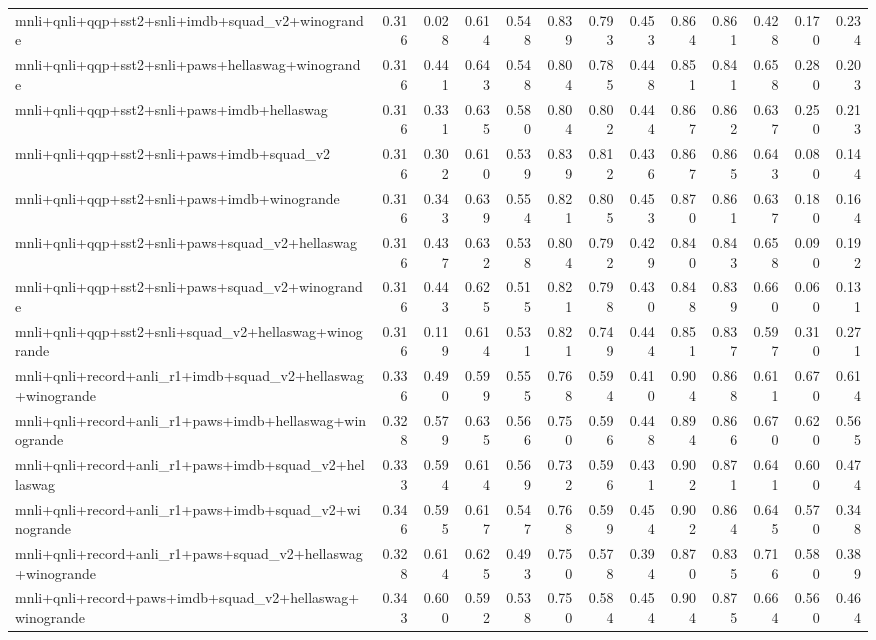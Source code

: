 \begin{table}[t]
\begin{tabular}{lrrrrrrrrrrrr}
    mnli+qnli+qqp+sst2+snli+imdb+squad\_v2+winogrande & 0.316 & 0.028 & 0.614 & 0.548 & 0.839 & 0.793 & 0.453 & 0.864 & 0.861 & 0.428 & 0.170 & 0.234 \\
    mnli+qnli+qqp+sst2+snli+paws+hellaswag+winogrande & 0.316 & 0.441 & 0.643 & 0.548 & 0.804 & 0.785 & 0.448 & 0.851 & 0.841 & 0.658 & 0.280 & 0.203 \\
    mnli+qnli+qqp+sst2+snli+paws+imdb+hellaswag & 0.316 & 0.331 & 0.635 & 0.580 & 0.804 & 0.802 & 0.444 & 0.867 & 0.862 & 0.637 & 0.250 & 0.213 \\
    mnli+qnli+qqp+sst2+snli+paws+imdb+squad\_v2 & 0.316 & 0.302 & 0.610 & 0.539 & 0.839 & 0.812 & 0.436 & 0.867 & 0.865 & 0.643 & 0.080 & 0.144 \\
    mnli+qnli+qqp+sst2+snli+paws+imdb+winogrande & 0.316 & 0.343 & 0.639 & 0.554 & 0.821 & 0.805 & 0.453 & 0.870 & 0.861 & 0.637 & 0.180 & 0.164 \\
    mnli+qnli+qqp+sst2+snli+paws+squad\_v2+hellaswag & 0.316 & 0.437 & 0.632 & 0.538 & 0.804 & 0.792 & 0.429 & 0.840 & 0.843 & 0.658 & 0.090 & 0.192 \\
    mnli+qnli+qqp+sst2+snli+paws+squad\_v2+winogrande & 0.316 & 0.443 & 0.625 & 0.515 & 0.821 & 0.798 & 0.430 & 0.848 & 0.839 & 0.660 & 0.060 & 0.131 \\
    mnli+qnli+qqp+sst2+snli+squad\_v2+hellaswag+winogrande & 0.316 & 0.119 & 0.614 & 0.531 & 0.821 & 0.749 & 0.444 & 0.851 & 0.837 & 0.597 & 0.310 & 0.271 \\
    mnli+qnli+record+anli\_r1+imdb+squad\_v2+hellaswag+winogrande & 0.336 & 0.490 & 0.599 & 0.555 & 0.768 & 0.594 & 0.410 & 0.904 & 0.868 & 0.611 & 0.670 & 0.614 \\
    mnli+qnli+record+anli\_r1+paws+imdb+hellaswag+winogrande & 0.328 & 0.579 & 0.635 & 0.566 & 0.750 & 0.596 & 0.448 & 0.894 & 0.866 & 0.670 & 0.620 & 0.565 \\
    mnli+qnli+record+anli\_r1+paws+imdb+squad\_v2+hellaswag & 0.333 & 0.594 & 0.614 & 0.569 & 0.732 & 0.596 & 0.431 & 0.902 & 0.871 & 0.641 & 0.600 & 0.474 \\
    mnli+qnli+record+anli\_r1+paws+imdb+squad\_v2+winogrande & 0.346 & 0.595 & 0.617 & 0.547 & 0.768 & 0.599 & 0.454 & 0.902 & 0.864 & 0.645 & 0.570 & 0.348 \\
    mnli+qnli+record+anli\_r1+paws+squad\_v2+hellaswag+winogrande & 0.328 & 0.614 & 0.625 & 0.493 & 0.750 & 0.578 & 0.394 & 0.870 & 0.835 & 0.716 & 0.580 & 0.389 \\
    mnli+qnli+record+paws+imdb+squad\_v2+hellaswag+winogrande & 0.343 & 0.600 & 0.592 & 0.538 & 0.750 & 0.584 & 0.454 & 0.904 & 0.875 & 0.664 & 0.560 & 0.464 \\

\end{tabular}
\end{table}

